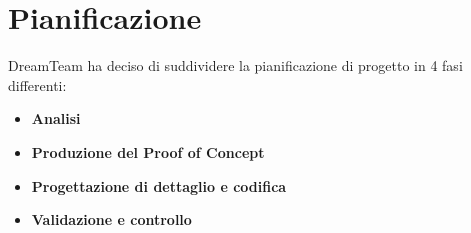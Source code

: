 \section{Pianificazione}
DreamTeam ha deciso di suddividere la pianificazione di progetto in 4 fasi differenti:

\begin{itemize}
\item \textbf{Analisi}
\item \textbf{Produzione del Proof of Concept}
\item \textbf{Progettazione di dettaglio e codifica}
\item \textbf{Validazione e controllo}
\end{itemize}









